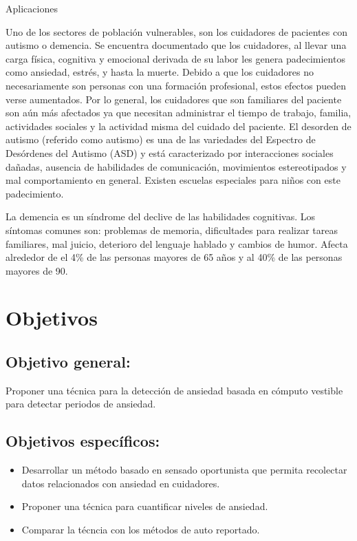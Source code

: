 \documentclass[letterpaper,12pt]{cicese}
\begin{document}
			Aplicaciones

                        Uno de los sectores de poblaci\'on vulnerables, son los cuidadores de pacientes con autismo o demencia. Se encuentra documentado que los cuidadores, al llevar una carga f\'isica, cognitiva y emocional derivada de su labor les genera padecimientos como ansiedad, estr\'es, y hasta la muerte\citep{Chen2013}. Debido a que los cuidadores no necesariamente son personas con una formaci\'on profesional, estos efectos pueden verse aumentados. Por lo general, los cuidadores que son familiares del paciente son a\'un m\'as afectados ya que necesitan administrar el tiempo de trabajo, familia, actividades sociales y la actividad misma del cuidado del paciente.
                        El desorden de autismo (referido como autismo) es una de las variedades del Espectro de Des\'ordenes del Autismo (ASD) y est\'a caracterizado por interacciones sociales da\~nadas, ausencia de habilidades de comunicaci\'on, movimientos estereotipados y mal comportamiento en general\citep{bernier2010autism}. Existen escuelas especiales para ni\~nos con este padecimiento.

La demencia es un s\'indrome del declive de las habilidades cognitivas. Los s\'intomas comunes son: problemas de memoria, dificultades para realizar tareas familiares, mal juicio, deterioro del lenguaje hablado y cambios de humor\citep{Aziz}. Afecta alrededor de el 4\% de las personas mayores de 65 a\~nos y al 40\% de las personas mayores de 90.


	\chapter{Objetivos}
		
	\section{\textbf{Objetivo general:}}
			Proponer una t\'ecnica para la detecci\'on de ansiedad basada en c\'omputo vestible para detectar periodos de ansiedad.

	\section{\textbf{Objetivos espec\'ificos:}}
		\begin{itemize}
			\item Desarrollar un m\'etodo basado en sensado oportunista que permita recolectar datos relacionados con ansiedad en cuidadores.
			\item Proponer una t\'ecnica para cuantificar niveles de ansiedad.
			\item Comparar la t\'ecncia con los m\'etodos de auto reportado.
		\end{itemize}
\end{document}
